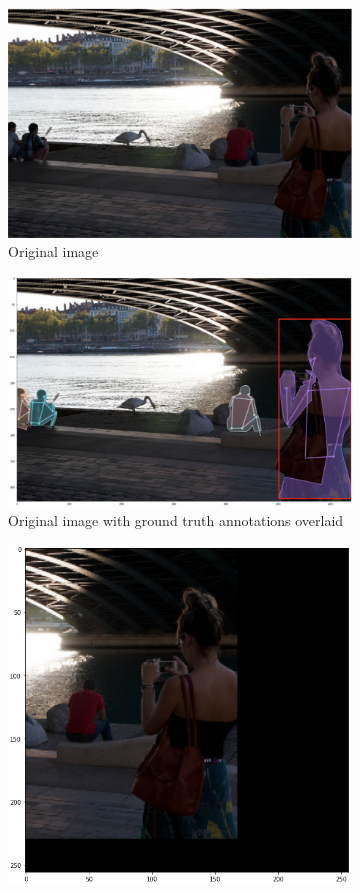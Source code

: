 \documentclass[11pt, letterpaper]{article}
\begin{document}
\begin{figure}[h]
    \centering
    \begin{subfigure}{0.4\textwidth}
        \centering
        \includegraphics[width=0.8\linewidth]{original_image.png}
        \caption{Original image}
    \end{subfigure}
    \begin{subfigure}{0.4\textwidth}
        \centering
        \includegraphics[width=0.8\linewidth]{original_w_gt.png}
        \caption{Original image with ground truth annotations overlaid}
    \end{subfigure}
    \begin{subfigure}{0.4\textwidth}
        \centering
        \includegraphics[width=0.8\linewidth]{processed_image.png}

\end{subfigure}
\end{figure}
\end{document}
